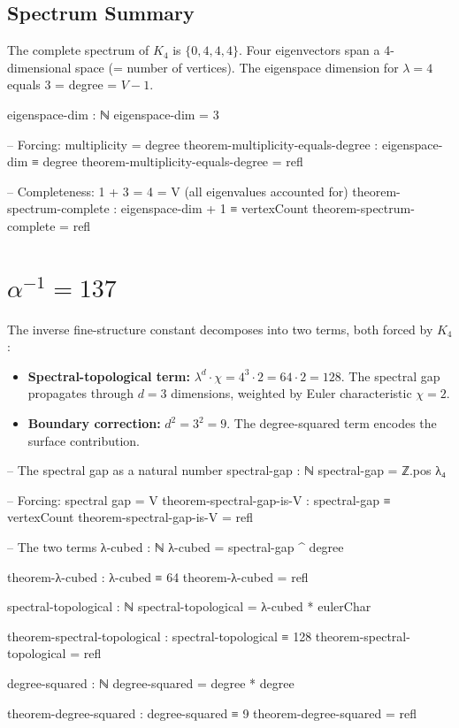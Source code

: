\documentclass[11pt,a4paper]{article}
\begin{document}
\subsection{Spectrum Summary}

The complete spectrum of $K_4$ is $\{0, 4, 4, 4\}$.
Four eigenvectors span a 4-dimensional space (= number of vertices).
The eigenspace dimension for $\lambda = 4$ equals 3 = degree = $V - 1$.

\begin{code}
eigenspace-dim : ℕ
eigenspace-dim = 3

-- Forcing: multiplicity = degree
theorem-multiplicity-equals-degree : eigenspace-dim ≡ degree
theorem-multiplicity-equals-degree = refl

-- Completeness: 1 + 3 = 4 = V (all eigenvalues accounted for)
theorem-spectrum-complete : eigenspace-dim + 1 ≡ vertexCount
theorem-spectrum-complete = refl
\end{code}

\section{$\alpha^{-1} = 137$}
\label{sec:alpha}

The inverse fine-structure constant decomposes into two terms,
both forced by $K_4$:

\begin{itemize}
\item \textbf{Spectral-topological term:} $\lambda^d \cdot \chi
  = 4^3 \cdot 2 = 64 \cdot 2 = 128$.
  The spectral gap propagates through $d = 3$ dimensions,
  weighted by Euler characteristic $\chi = 2$.
\item \textbf{Boundary correction:} $d^2 = 3^2 = 9$.
  The degree-squared term encodes the surface contribution.
\end{itemize}

\begin{code}
-- The spectral gap as a natural number
spectral-gap : ℕ
spectral-gap = ℤ.pos λ₄

-- Forcing: spectral gap = V
theorem-spectral-gap-is-V : spectral-gap ≡ vertexCount
theorem-spectral-gap-is-V = refl

-- The two terms
λ-cubed : ℕ
λ-cubed = spectral-gap ^ degree

theorem-λ-cubed : λ-cubed ≡ 64
theorem-λ-cubed = refl

spectral-topological : ℕ
spectral-topological = λ-cubed * eulerChar

theorem-spectral-topological : spectral-topological ≡ 128
theorem-spectral-topological = refl

degree-squared : ℕ
degree-squared = degree * degree

theorem-degree-squared : degree-squared ≡ 9
theorem-degree-squared = refl
\end{code}
\end{document}
